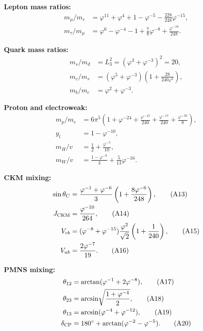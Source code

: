 \documentclass[aps,prd,twocolumn,superscriptaddress,nofootinbib,showpacs]{revtex4-2}
\begin{document}
\textbf{Lepton mass ratios:}
\begin{align}
m_\mu/m_e &= \varphi^{11} + \varphi^4 + 1 - \varphi^{-5} - \tfrac{228}{248}\varphi^{-15},
\tag{A4}\label{eq:A4} \\
m_\tau/m_\mu &= \varphi^6 - \varphi^{-4} - 1 + \tfrac{7}{8}\varphi^{-8} + \tfrac{\varphi^{-18}}{248}.
\tag{A5}\label{eq:A5}
\end{align}

\textbf{Quark mass ratios:}
\begin{align}
m_s/m_d &= L_3^2 = (\varphi^3 + \varphi^{-3})^2 = 20,
\tag{A6}\label{eq:A6} \\
m_c/m_s &= (\varphi^5 + \varphi^{-3})\left(1 + \frac{28}{240\varphi^2}\right),
\tag{A7}\label{eq:A7} \\
m_b/m_c &= \varphi^2 + \varphi^{-3}.
\tag{A8}\label{eq:A8}
\end{align}

\textbf{Proton and electroweak:}
\begin{align}
m_p/m_e &= 6\pi^5\!\left(1 + \varphi^{-24} + \frac{\varphi^{-13}}{240}
+ \frac{\varphi^{-17}}{240} + \frac{\varphi^{-33}}{8}\right),
\tag{A9}\label{eq:A9} \\
y_t &= 1 - \varphi^{-10},
\tag{A10}\label{eq:A10} \\
m_H/v &= \frac{1}{2} + \frac{\varphi^{-5}}{10},
\tag{A11}\label{eq:A11} \\
m_W/v &= \frac{1 - \varphi^{-8}}{3} + \frac{5}{13}\varphi^{-16}.
\tag{A12}\label{eq:A12}
\end{align}

\textbf{CKM mixing:}
\begin{align}
\sin\theta_C &= \frac{\varphi^{-1}+\varphi^{-6}}{3}
\left(1 + \frac{8\varphi^{-6}}{248}\right),
\tag{A13}\label{eq:A13} \\
J_{\rm CKM} &= \frac{\varphi^{-10}}{264},
\tag{A14}\label{eq:A14} \\
V_{cb} &= (\varphi^{-8}+\varphi^{-15})\frac{\varphi^2}{\sqrt{2}}
\left(1+\frac{1}{240}\right),
\tag{A15}\label{eq:A15} \\
V_{ub} &= \frac{2\varphi^{-7}}{19}.
\tag{A16}\label{eq:A16}
\end{align}

\textbf{PMNS mixing:}
\begin{align}
\theta_{12} &= \arctan(\varphi^{-1}+2\varphi^{-8}),
\tag{A17}\label{eq:A17} \\
\theta_{23} &= \arcsin\!\sqrt{\frac{1+\varphi^{-4}}{2}},
\tag{A18}\label{eq:A18} \\
\theta_{13} &= \arcsin(\varphi^{-4}+\varphi^{-12}),
\tag{A19}\label{eq:A19} \\
\delta_{\rm CP} &= 180^\circ + \arctan(\varphi^{-2}-\varphi^{-5}).
\tag{A20}\label{eq:A20}
\end{align}
\end{document}
